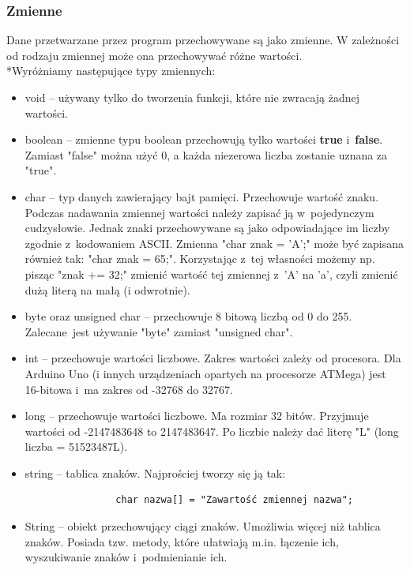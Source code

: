 \documentclass[a4paper,12pt, twoside]{article}
\begin{document}
	\subsubsection{Zmienne}
		Dane przetwarzane przez program przechowywane są jako zmienne. W zależności od rodzaju zmiennej może ona przechowywać różne wartości.
		\\*Wyróżniamy następujące typy zmiennych:
		\begin{itemize}
			\item void -- używany tylko do tworzenia funkcji, które nie zwracają żadnej wartości.
			\item boolean -- zmienne typu boolean przechowują tylko wartości \textbf{true} i~\textbf{false}. Zamiast "false" można użyć $0$, a każda niezerowa liczba zostanie uznana za "true".
			\item char -- typ danych zawierający bajt pamięci. Przechowuje wartość znaku.
				Podczas nadawania zmiennej wartości należy zapisać ją w~pojedynczym cudzysłowie.
				Jednak znaki przechowywane są jako odpowiadające im liczby zgodnie z~kodowaniem ASCII.
				Zmienna "char znak = 'A';" może być zapisana również tak: "char znak = 65;".
				Korzystając z~tej własności możemy np. pisząc "znak += 32;" zmienić wartość tej zmiennej z~'A' na 'a', czyli zmienić dużą literą na małą (i odwrotnie).
			\item byte oraz unsigned char -- przechowuje 8 bitową liczbą od 0 do 255. Zalecane~jest używanie "byte" zamiast "unsigned char".
			\item int -- przechowuje wartości liczbowe. Zakres wartości zależy od procesora.
				Dla Arduino Uno (i innych urządzeniach opartych na procesorze ATMega) jest 16-bitowa i~ma zakres od -32768 do 32767.
			\item long -- przechowuje wartości liczbowe. Ma rozmiar 32 bitów. Przyjmuje wartości od -2147483648 to 2147483647. Po liczbie należy dać literę "L" (long liczba = 51523487L).
			\item string -- tablica znaków. Najprościej tworzy się ją tak:
				\begin{verbatim}
				char nazwa[] = "Zawartość zmiennej nazwa";
				\end{verbatim}
			\item String -- obiekt przechowujący ciągi znaków. Umożliwia więcej niż tablica znaków. Posiada tzw. metody, które ułatwiają m.in. łączenie ich, wyszukiwanie znaków i~podmienianie ich.
		\end{itemize}
	
\end{document}
